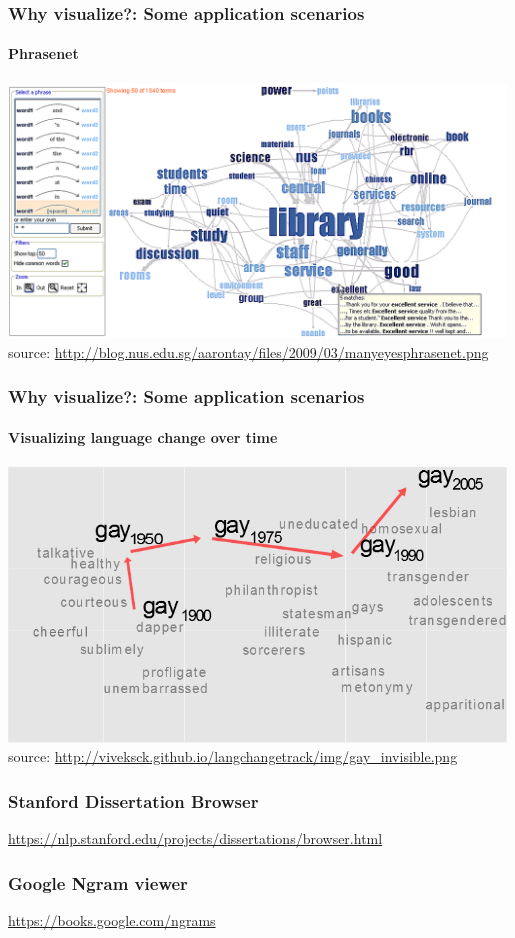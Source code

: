\documentclass{beamer}
\begin{document}
\begin{frame}
\frametitle{Why visualize?: Some application scenarios}
\framesubtitle{Phrasenet}
\includegraphics[width=0.99\textwidth]{phrasenet.png} \\
\scriptsize source: \url{http://blog.nus.edu.sg/aarontay/files/2009/03/manyeyesphrasenet.png} 
\end{frame}

\begin{frame}
\frametitle{Why visualize?: Some application scenarios}
\framesubtitle{Visualizing language change over time}
\includegraphics[width=0.99\textwidth]{gay_invisible.png} \\
\scriptsize source: \url{http://viveksck.github.io/langchangetrack/img/gay_invisible.png} 
\end{frame}

\begin{frame}
\frametitle{Stanford Dissertation Browser}
\url{https://nlp.stanford.edu/projects/dissertations/browser.html}
\end{frame}

\begin{frame}
\frametitle{Google Ngram viewer}
\url{https://books.google.com/ngrams}
\end{frame}
\end{document}
